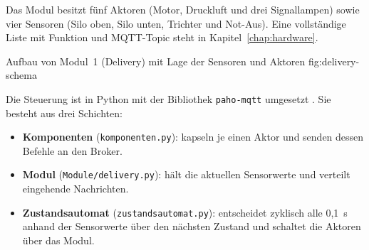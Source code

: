 Das Modul besitzt fünf Aktoren (Motor, Druckluft und drei Signallampen) sowie vier
Sensoren (Silo oben, Silo unten, Trichter und Not-Aus). Eine vollständige Liste mit
Funktion und MQTT-Topic steht in Kapitel~\ref{chap:hardware}.

  {Aufbau von Modul~1 (Delivery) mit Lage der Sensoren und Aktoren \cite{doku-popcorn}}
  {fig:delivery-schema}

Die Steuerung ist in Python mit der Bibliothek \texttt{paho-mqtt} umgesetzt
\cite{paho}. Sie besteht aus drei Schichten:
\begin{itemize}
  \item \textbf{Komponenten} (\texttt{komponenten.py}): kapseln je einen Aktor
        und senden dessen Befehle an den Broker.
  \item \textbf{Modul} (\texttt{Module/delivery.py}): hält die aktuellen
        Sensorwerte und verteilt eingehende Nachrichten.
  \item \textbf{Zustandsautomat} (\texttt{zustandsautomat.py}): entscheidet
        zyklisch alle 0,1~s anhand der Sensorwerte über den nächsten
        Zustand und schaltet die Aktoren über das Modul.
\end{itemize}

